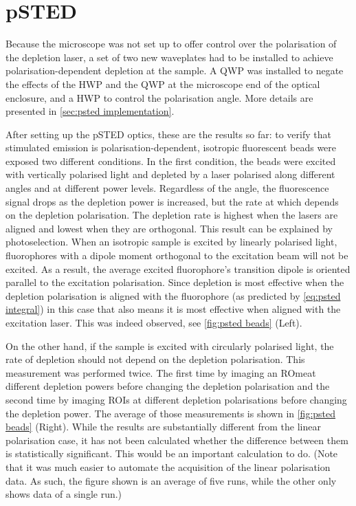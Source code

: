 \section{pSTED}

Because the microscope was not set up to offer control over the polarisation of the depletion laser, a set of two new waveplates had to be installed to achieve polarisation-dependent depletion at the sample. A QWP was installed to negate the effects of the HWP and the QWP at the microscope end of the optical enclosure, and a HWP to control the polarisation angle. More details are presented in \autoref{sec:psted implementation}.

After setting up the pSTED optics, these are the results so far: to verify that stimulated emission is polarisation-dependent, isotropic fluorescent beads were exposed two different conditions. In the first condition, the beads were excited with vertically polarised light and depleted by a laser polarised along different angles and at different power levels. Regardless of the angle, the fluorescence signal drops as the depletion power is increased, but the rate at which depends on the depletion polarisation. The depletion rate is highest when the lasers are aligned and lowest when they are orthogonal. This result can be explained by photoselection. When an isotropic sample is excited by linearly polarised light, fluorophores with a dipole moment orthogonal to the excitation beam will not be excited. As a result, the average excited fluorophore's transition dipole is oriented parallel to the excitation polarisation. Since depletion is most effective when the depletion polarisation is aligned with the fluorophore (as predicted by \autoref{eq:psted integral}) in this case that also means it is most effective when aligned with the excitation laser. This was indeed observed, see \autoref{fig:psted beads} (Left). 

On the other hand, if the sample is excited with circularly polarised light, the rate of depletion should not depend on the depletion polarisation. This measurement was performed twice. The first time by imaging an ROmeat different depletion powers before changing the depletion polarisation and the second time by imaging ROIs at different depletion polarisations before changing the depletion power. The average of those measurements is shown in \autoref{fig:psted beads} (Right). While the results are substantially different from the linear polarisation case, it has not been calculated whether the difference between them is statistically significant. This would be an important calculation to do. (Note that it was much easier to automate the acquisition of the linear polarisation data. As such, the figure shown is an average of five runs, while the other only shows data of a single run.)

